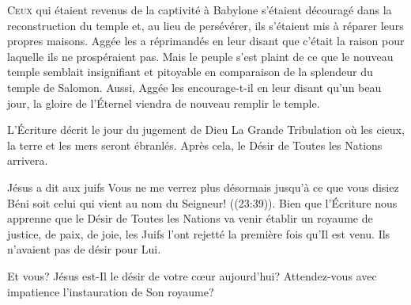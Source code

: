 \lettrine{C}{eux} qui étaient revenus de la captivité à Babylone
 s'étaient découragé dans la reconstruction du temple et,
 au lieu de persévérer, ils s'étaient mis à réparer leurs propres maisons.
 Aggée les a réprimandés en leur disant que c'était la raison
 pour laquelle ils ne prospéraient pas. Mais le peuple s'est plaint
 de ce que le nouveau temple semblait insignifiant et pitoyable
 en comparaison de la splendeur du temple de Salomon.
 Aussi, Aggée les encourage-t-il en leur disant qu'un beau jour,
 la gloire de l'Éternel viendra de nouveau remplir le temple. 


L'Écriture décrit le jour du jugement de Dieu
 \ocadr La Grande Tribulation \fcadr{} où les cieux,
 la terre et les mers seront ébranlés. Après cela,
 le \Og Désir de Toutes les Nations \Fg{} arrivera. 

Jésus a dit aux juifs\frcolon{} 
 \Og Vous ne me verrez plus désormais jusqu'à ce que vous disiez\frcolon{}
 Béni soit celui qui vient au nom du Seigneur! \Fg{} ((23:39)).
 Bien que l'Écriture nous apprenne que \Og le Désir de Toutes les Nations \Fg{}
 va venir établir un royaume de justice, de paix, de joie, les Juifs
 l'ont rejetté la première fois qu'Il est venu.
 Ils n'avaient pas de désir pour Lui. 

Et vous? Jésus est-Il le désir de votre c\oe{}ur aujourd'hui?
 Attendez-vous avec impatience l'instauration de Son royaume? 

\dvrule







